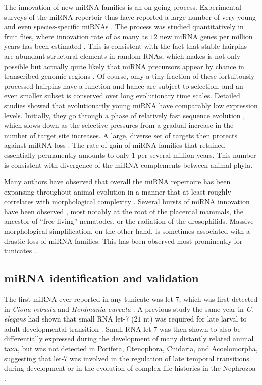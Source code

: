 \documentclass[graybox]{svmult}
\begin{document}
The innovation of new miRNA families is an on-going process. Experimental
surveys of the miRNA repertoir thus have reported a large number of very
young and even species-specific miRNAs \cite{Bentwich:05, Berezikov:06}. The
process was studied quantitatively in fruit flies, where innovation rate of
as many as $12$ new miRNA genes per million years has been estimated
\cite{Lu:08}. This is consistent with the fact that stable hairpins are
abundant structural elements in random RNAs, which makes is not only
possible but actually quite likely that miRNA precursors appear by chance
in transcribed genomic regions \cite{Tanzer:04a, CampoPaysaa:11, Marco:13}.
Of course, only a tiny fraction of these fortuitously processed hairpins
have a function and hance are subject to selection, and an even smaller
subset is conserved over long evolutionary time scales. Detailed studies
showed that evolutionarily young miRNA have comparably low expression
levels. Initially, they go through a phase of relatively fast sequence
evolution \cite{Liang:09, Meunier:12}, which slows down as the selective
pressures from a gradual increase in the number of target site increases. A
large, diverse set of targets then protects against miRNA loss
\cite{Lee:07a}. The rate of gain of miRNA families that retained
essentially permanently amounts to only $1$ per several million years. This
number is consistent with divergence of the miRNA complements between
animal phyla.

Many authors have observed that overall the miRNA repertoire has been
expansing throughout animal evolution in a manner that at least roughly
correlates with morphological complexity \cite{Hertel:06a, Sempere:06, Niwa:07, 
Prochnik:07, Lee:07a, Heimberg:08, Peterson:09, Berezikov:11}. Several bursts 
of miRNA innovation have been observed \cite{Hertel:06a, Heimberg:08, 
Tanzer:10a, Hertel:15a}, most notably at the root of the placental mammals, the 
ancestor of ``free-living'' nematodes, or the radiation of the drosophilids. 
Massive morphological simplification, on the other hand, is sometimes 
associated with a drastic loss of miRNA families. This has been observed most 
prominently for tunicates \cite{Fu:08, Dai:09}.

\subsection{miRNA identification and validation}

The first miRNA ever reported in any tunicate was let-7, which was 
first detected in \textit{Ciona robusta} and \textit{Herdmania curvata} 
\cite{Pasquinelli2000}. A previous study the same year in \textit{C. elegans} 
had shown that small RNA let-7 ($21$ nt) was required for late larval to adult 
developmental transition \cite{Reinhart:2000mz}. Small RNA let-7 was then shown 
to also be differentially expressed during the development of many distantly 
related animal taxa, but was not detected in Porifera, Ctenophora, Cnidaria, 
and Acoelomorpha, suggesting that let-7 was involved in the regulation of late 
temporal transitions during development or in the evolution of complex life 
histories in the Nephrozoa \cite{Pasquinelli2000, Pasquinelli2003}.
\end{document}
